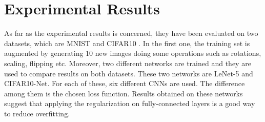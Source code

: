 \section{Experimental Results}

As far as the experimental results is concerned, they have been evaluated on two datasets, which are MNIST \citep{MNIST} and CIFAR10 \citep{CIFAR10and100}. In the first one, the training set is augmented by generating 10 new images doing some operations such as rotations, scaling, flipping etc. Moreover, two different networks are trained and they are used to compare results on both datasets. These two networks are LeNet-5 and CIFAR10-Net. For each of these, six different CNNs are used. The difference among them is the chosen loss function. Results obtained on these networks suggest that applying the regularization on fully-connected layers is a good way to reduce overfitting.